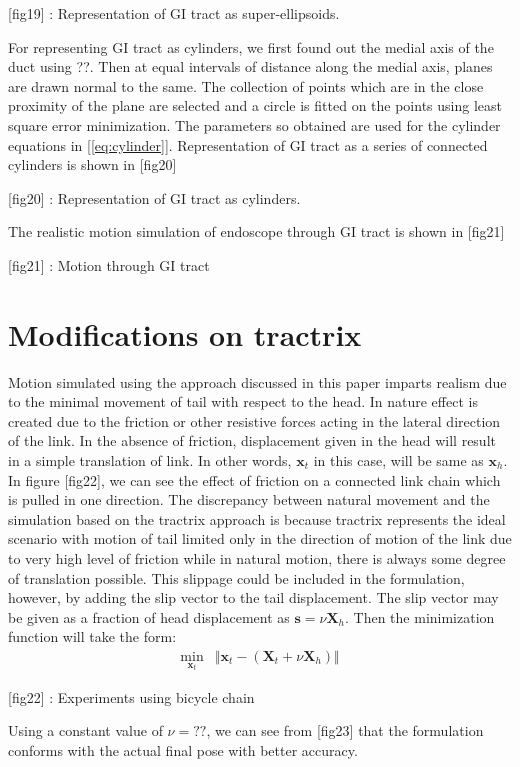 \documentclass[12pt,a4]{article}
\begin{document}
[fig19] : Representation of GI tract as super-ellipsoids.

For representing GI tract as cylinders, we first found out the medial axis of the duct using ??. Then at equal intervals of distance along the medial axis, planes are drawn normal to the same. The collection of points which are in the close proximity of the plane are selected and a circle is fitted on the points using least square error minimization. The parameters so obtained are used for the cylinder equations in [\ref{eq:cylinder}]. Representation of GI tract as a series of connected cylinders is shown in [fig20]

[fig20] : Representation of GI tract as cylinders.

The realistic motion simulation of endoscope through GI tract is shown in [fig21]

[fig21] : Motion through GI tract
\section{Modifications on tractrix}
Motion simulated using the approach discussed in this paper imparts realism due to the minimal movement of tail with respect to the head. In nature effect is created due to the friction or other resistive forces acting in the lateral direction of the link. In the absence of friction, displacement given in the head will result in a simple translation of link. In other words, $\mathbf{x}_t$ in this case, will be same as $\mathbf{x}_h$. In figure [fig22], we can see the effect of friction on a connected link chain which is pulled in one direction. The discrepancy between natural movement and the simulation based on the tractrix approach is because tractrix represents the ideal scenario with motion of tail limited only in the direction of motion of the link due to very high level of friction while in natural motion, there is always some degree of translation possible. This slippage could be included in the formulation, however, by adding the slip vector to the tail displacement. The slip vector may be given as a fraction of head displacement as $\mathbf{s} = \nu \mathbf{X}_h$. Then the minimization function will take the form:
\begin{align}
\min_{\textbf{x}_t} &\Vert \textbf{x}_t-\left(\mathbf{X}_t + \nu \mathbf{X}_h \right) \Vert
\end{align}

[fig22] : Experiments using bicycle chain

Using a constant value of $\nu = ??$, we can see from [fig23] that the formulation conforms with the actual final pose with better accuracy. 
\end{document}
